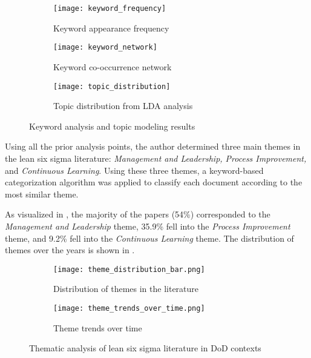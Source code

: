 \documentclass{article}
\begin{document}
	\begin{figure}[htbp]
		\centering
		\begin{subfigure}[b]{0.32\textwidth}
			\centering
			\texttt{[image: keyword\_frequency]}
			\caption{Keyword appearance frequency}
			\label{fig:keyword_freq}
		\end{subfigure}
		\hfill
		\begin{subfigure}[b]{0.32\textwidth}
			\centering
			\texttt{[image: keyword\_network]}
			\caption{Keyword co-occurrence network}
			\label{fig:keyword_network}
		\end{subfigure}
		\hfill
		\begin{subfigure}[b]{0.32\textwidth}
			\centering
			\texttt{[image: topic\_distribution]}
			\caption{Topic distribution from LDA analysis}
			\label{fig:topics}
		\end{subfigure}
		\caption{Keyword analysis and topic modeling results}
		\label{fig:keyword_analysis}
	\end{figure}


	Using all the prior analysis points, the author determined three main themes in the lean six sigma literature: \textit{Management and Leadership, Process Improvement,} and \textit{Continuous Learning}. 
	Using these three themes, a keyword-based categorization algorithm was applied to classify each document according to the most similar theme.

	As visualized in , the majority of the papers (54\%) corresponded to the \textit{Management and Leadership} theme, 35.9\% fell into the \textit{Process Improvement} theme, and 9.2\% fell into the \textit{Continuous Learning} theme.
	The distribution of themes over the years is shown in .


	\begin{figure}[htbp]
		\centering
		\begin{subfigure}[b]{0.48\textwidth}
			\centering
			\texttt{[image: theme\_distribution\_bar.png]}
			\caption{Distribution of themes in the literature}
			\label{fig:theme_distribution_bar}
		\end{subfigure}
		\hfill
		\begin{subfigure}[b]{0.48\textwidth}
			\centering
			\texttt{[image: theme\_trends\_over\_time.png]}
			\caption{Theme trends over time}
			\label{fig:theme_trends}
		\end{subfigure}
		\caption{Thematic analysis of lean six sigma literature in DoD contexts}
		\label{fig:theme_analysis}
	\end{figure}
\end{document}
